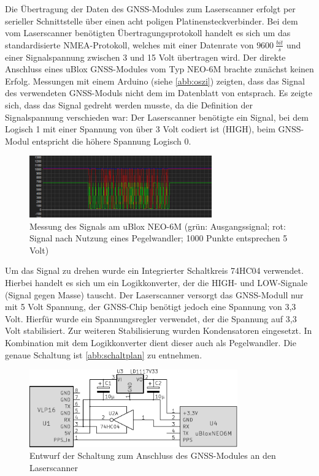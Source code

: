 \documentclass[a4paper,12pt,bibliography=totoc, listof=totoc,titlepage,pointlessnumbers]{scrreprt}
\begin{document}
Die Übertragung der Daten des GNSS-Modules zum Laser\-scan\-ner erfolgt per serieller Schnittstelle über einen acht poligen Platinensteckverbinder. Bei dem vom Laser\-scan\-ner benötigten Übertragungsprotokoll handelt es sich um das standardisierte NMEA-Protokoll, welches mit einer Datenrate von \(9600~\frac{bit}{s}\) und einer Signalspannung zwischen 3 und 15 Volt übertragen wird. Der direkte Anschluss eines uBlox GNSS-Modules vom Typ NEO-6M brachte zunächst keinen Erfolg. Messungen mit einem Arduino (siehe \autoref{abb:oszi}) zeigten, dass das Signal des verwendeten GNSS-Moduls nicht dem im Datenblatt von \citet[S. 3]{vlpInterface} entsprach. Es zeigte sich, dass das Signal gedreht werden musste, da die Definition der Signalspannung verschieden war: Der Laser\-scan\-ner benötigte ein Signal, bei dem Logisch 1 mit einer Spannung von über 3 Volt \citep[S. 3]{vlpInterface} codiert ist (HIGH), beim GNSS-Modul entspricht  die höhere Spannung Logisch 0.

\begin{figure}
 \centering
 \includegraphics[width=0.7\textwidth]{img/oszi.png}
 \caption{Messung des Signals am uBlox NEO-6M (grün: Ausgangssignal; rot: Signal nach Nutzung eines Pegelwandler; 1000 Punkte entsprechen 5 Volt)}
 \label{abb:oszi}
\end{figure}

Um das Signal zu drehen wurde ein Integrierter Schaltkreis 74HC04 verwendet. Hierbei handelt es sich um ein Logikkonverter, der die HIGH- und LOW-Signale (Signal gegen Masse) tauscht. Der Laser\-scan\-ner versorgt das GNSS-Modull nur mit 5 Volt Spannung, der GNSS-Chip benötigt jedoch eine Spannung von 3,3 Volt. Hierfür wurde ein Spannungsregler verwendet, der die Spannung auf 3,3 Volt stabilisiert. Zur weiteren Stabilisierung wurden Kondensatoren eingesetzt. In Kombination mit dem Logikkonverter dient dieser auch als Pegelwandler. Die genaue Schaltung ist \autoref{abb:schaltplan} zu entnehmen.

\begin{figure}
 \centering
 \includegraphics[width=0.8\textwidth]{img/schaltplanGnss.pdf}
 \caption{Entwurf der Schaltung zum Anschluss des GNSS-Modules an den Laser\-scan\-ner}
 \label{abb:schaltplan}
\end{figure}
\end{document}
